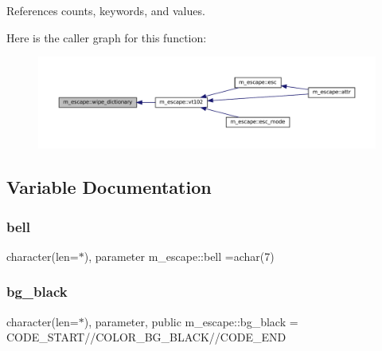 References counts, keywords, and values.

Here is the caller graph for this function\+:\nopagebreak
\begin{figure}[H]
\begin{center}
\leavevmode
\includegraphics[width=350pt]{namespacem__escape_a1bc574bc97157fe67d868d2bd180c91e_icgraph}
\end{center}
\end{figure}


\subsection{Variable Documentation}
\mbox{\label{namespacem__escape_a2cd9c30d3783af9d1f74a50e7f1dbd7f}} 
\subsubsection{\texorpdfstring{bell}{bell}}
{\footnotesize\ttfamily character(len=$\ast$), parameter m\+\_\+escape\+::bell =achar(7)\hspace{0.3cm}{\ttfamily [private]}}

\mbox{\label{namespacem__escape_a2f34e53ba01ebac10ab70f25e3c9727a}} 
\subsubsection{\texorpdfstring{bg\+\_\+black}{bg\_black}}
{\footnotesize\ttfamily character(len=$\ast$), parameter, public m\+\_\+escape\+::bg\+\_\+black = C\+O\+D\+E\+\_\+\+S\+T\+A\+RT//C\+O\+L\+O\+R\+\_\+\+B\+G\+\_\+\+B\+L\+A\+CK//C\+O\+D\+E\+\_\+\+E\+ND}

\mbox{\label{namespacem__escape_afab2229302287eaa0eb05add07bb6621}} 
